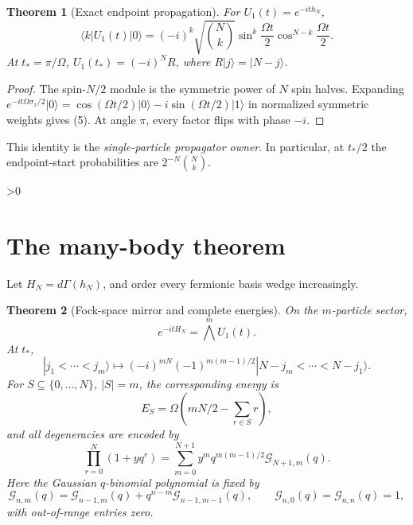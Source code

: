 \documentclass[10pt]{article}
\newtheorem{theorem}{Theorem}
\providecommand{\CRevisionRound}{2}
\begin{document}
\begin{theorem}[Exact endpoint propagation]
For \(U_1(t)=e^{-ith_N}\),
\begin{equation}
\langle k|U_1(t)|0\rangle=(-i)^k\sqrt{\binom Nk}
 \sin^k\!\frac{\Omega t}{2}\cos^{N-k}\!\frac{\Omega t}{2}.
\end{equation}
At \(t_*=\pi/\Omega\), \(U_1(t_*)=(-i)^NR\), where
\(R|j\rangle=|N-j\rangle\).
\end{theorem}

\begin{proof}
The spin-\(N/2\) module is the symmetric power of \(N\) spin halves.
Expanding
\(e^{-it\Omega\sigma_x/2}|0\rangle=\cos(\Omega t/2)|0\rangle-
i\sin(\Omega t/2)|1\rangle\) in normalized symmetric weights gives (5).
At angle \(\pi\), every factor flips with phase \(-i\).
\end{proof}
This identity is the \emph{single-particle propagator owner}.  In particular,
at \(t_*/2\) the endpoint-start probabilities are \(2^{-N}\binom Nk\).

\ifnum\CRevisionRound>0
\section{The many-body theorem}
Let \(H_N=d\Gamma(h_N)\), and order every fermionic basis wedge increasingly.

\begin{theorem}[Fock-space mirror and complete energies]
On the \(m\)-particle sector,
\begin{equation}
e^{-itH_N}=\bigwedge^m U_1(t).
\end{equation}
At \(t_*\),
\begin{equation}
|j_1<\cdots<j_m\rangle\mapsto
(-i)^{mN}(-1)^{m(m-1)/2}
|N-j_m<\cdots<N-j_1\rangle .
\end{equation}
For \(S\subseteq\{0,\ldots,N\}\), \(|S|=m\), the corresponding energy is
\begin{equation}
E_S=\Omega\left(mN/2-\sum_{r\in S}r\right),
\end{equation}
and all degeneracies are encoded by
\begin{equation}
\prod_{r=0}^N(1+yq^r)=
\sum_{m=0}^{N+1}y^mq^{m(m-1)/2}
\mathcal G_{N+1,m}(q).
\end{equation}
Here the Gaussian $q$-binomial polynomial is fixed by
\begin{equation}
\mathcal G_{n,m}(q)=\mathcal G_{n-1,m}(q)+
q^{n-m}\mathcal G_{n-1,m-1}(q),
\qquad
\mathcal G_{n,0}(q)=\mathcal G_{n,n}(q)=1,
\end{equation}
with out-of-range entries zero.
\end{theorem}
\end{document}
